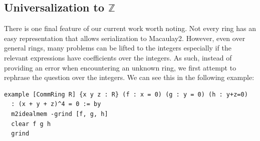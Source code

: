 \documentclass[runningheads]{llncs}
\begin{document}




\subsection*{Universalization to $\mathbb{Z}$}

There is one final feature of our current work worth noting.
Not every ring has an easy representation that allows serialization to Macaulay2. However, even over general rings, many problems can be lifted to the integers especially if the relevant expressions have coefficients over the integers. As such, instead of providing an error when encountering an unknown ring, we first attempt to rephrase the question over the integers. We can see this in the following example:
\begin{verbatim}
example [CommRing R] {x y z : R} (f : x = 0) (g : y = 0) (h : y+z=0)
  : (x + y + z)^4 = 0 := by
  m2idealmem -grind [f, g, h]
  clear f g h
  grind
\end{verbatim}
\end{document}
